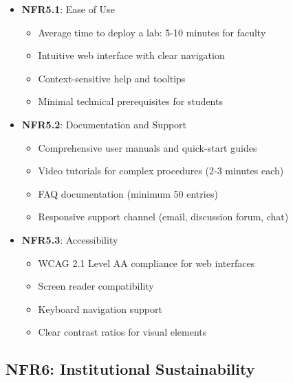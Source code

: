 \begin{itemize}

\item \textbf{NFR5.1}: Ease of Use
\begin{itemize}
\item Average time to deploy a lab: 5-10 minutes for faculty
\item Intuitive web interface with clear navigation
\item Context-sensitive help and tooltips
\item Minimal technical prerequisites for students
\end{itemize}

\item \textbf{NFR5.2}: Documentation and Support
\begin{itemize}
\item Comprehensive user manuals and quick-start guides
\item Video tutorials for complex procedures (2-3 minutes each)
\item FAQ documentation (minimum 50 entries)
\item Responsive support channel (email, discussion forum, chat)
\end{itemize}

\item \textbf{NFR5.3}: Accessibility
\begin{itemize}
\item WCAG 2.1 Level AA compliance for web interfaces
\item Screen reader compatibility
\item Keyboard navigation support
\item Clear contrast ratios for visual elements
\end{itemize}

\end{itemize}

\subsection{NFR6: Institutional Sustainability}

